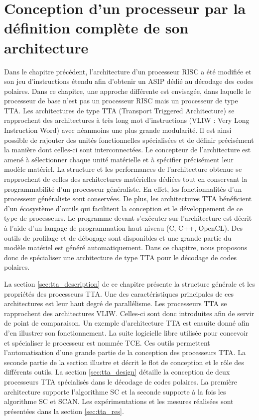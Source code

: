 \chapter{Conception d'un processeur par la définition complète de son architecture} %
\label{chap:tta}

\vspace*{\fill}
\minitocTITI
\vspace*{\fill}
\newpage

Dans le chapitre précédent, l'architecture d'un processeur RISC a été modifiée et son jeu d'instructions étendu afin d'obtenir un ASIP dédié au décodage des codes polaires. Dans ce chapitre, une approche différente est envisagée, dans laquelle le processeur de base n'est pas un processeur RISC mais un processeur de type TTA.
Les architectures de type TTA (Transport Triggered Architecture) se rapprochent des architectures à très long mot d'instructions (VLIW : Very Long Instruction Word) avec néanmoins une plus grande modularité. Il est ainsi possible de rajouter des unités fonctionnelles spécialisées et de définir précisément la manière dont celles-ci sont interconnectées. Le concepteur de l'architecture est amené à sélectionner chaque unité matérielle et à spécifier précisément leur modèle matériel. La structure et les performances de l'architecture obtenue se rapprochent de celles des architectures matérielles dédiées tout en conservant la programmabilité d'un processeur généraliste. En effet, les fonctionnalités d'un processeur généraliste sont conservées. De plus, les architectures TTA bénéficient d'un écosystème d'outils qui facilitent la conception et le développement de ce type de processeurs. Le programme devant s'exécuter sur l'architecture est décrit à l'aide d'un langage de programmation haut niveau  (C, C++, OpenCL). Des outils de profilage et de débogage sont disponibles et une grande partie du modèle matériel est généré automatiquement. Dans ce chapitre, nous proposons donc de spécialiser une architecture de type TTA pour le décodage de codes polaires.

La section \ref{sec:tta_description} de ce chapitre présente la structure générale et les propriétés des processeurs TTA. Une des caractéristiques principales de ces architectures est leur haut degré de parallélisme. Les processeurs TTA se rapprochent des architectures VLIW. Celles-ci sont donc introduites afin de servir de point de comparaison. Un exemple d'architecture TTA est ensuite donné afin d'en illustrer son fonctionnement. La suite logicielle libre utilisée pour concevoir et spécialiser le processeur est nommée TCE. Ces outils permettent l'automatisation d'une grande partie de la conception des processeurs TTA. La seconde partie de la section illustre et décrit le flot de conception et le rôle des différents outils. La section \ref{sec:tta_design} détaille la conception de deux processeurs TTA spécialisés dans le décodage de codes polaires. La première architecture supporte l'algorithme SC et la seconde supporte à la fois les algorithme SC et SCAN. Les expérimentations et les mesures réalisées sont présentées dans la section \ref{sec:tta_res}.

